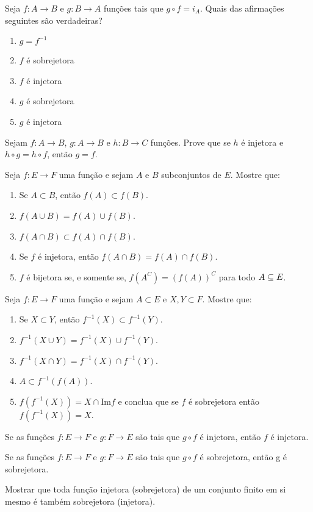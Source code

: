 \documentclass[12pt]{article}
\begin{document}
\vesp

\questao Seja $f : A \to B$ e $g : B \to A$ funções tais que $g \circ f = i_A$. Quais das afirmações seguintes são verdadeiras?
\begin{enumerate}
	\item $g = f^{-1}$
	\item $f$ é sobrejetora
	\item $f$ é injetora
	\item $g$ é sobrejetora
	\item $g$ é injetora
\end{enumerate}

\vesp

\questao Sejam $f : A \to B$, $g : A \to B$ e $h : B \to C$ funções. Prove que se $h$ é injetora e $h \circ g = h \circ f$, então $g = f$.

\vesp

\questao Seja $f:E\to F$ uma fun{\c c}{\~a}o e sejam $A$ e $B$ subconjuntos de $E$. Mostre que:
\begin{enumerate}[label={\alph*})]
\item Se $A\subset B$, ent{\~a}o $f(A)\subset f(B)$.
\item $f(A\cup B)=f(A)\cup f(B)$.
\item $f(A\cap B)\subset f(A)\cap f(B)$.
\item Se $f$ {\'e} injetora, ent{\~a}o $f(A\cap B) =  f(A)\cap f(B)$.
\item $f$ {\'e} bijetora se, e somente se, $f(A^C) = (f(A))^C$ para todo $A \subseteq E$.
\end{enumerate}

\vesp

\questao Seja $f:E\to F$ uma fun{\c c}{\~a}o e sejam $A\subset
E$ e $X, Y\subset F$. Mostre que:
\begin{enumerate}[label={\alph*})]
\item Se $X\subset Y$, ent{\~a}o $f^{-1}(X)\subset f^{-1}(Y)$.
\item $f^{-1}(X\cup Y)=f^{-1}(X)\cup f^{-1}(Y)$.
\item $f^{-1}(X\cap Y)= f^{-1}(X)\cap f^{-1}(Y)$.
\item $A\subset f^{-1}(f(A))$.
\item $f(f^{-1}(X))= X \cap \mbox{Im}f$ e conclua que se $f$ {\'e} sobrejetora ent{\~a}o
$f(f^{-1}(X))=X$.
\end{enumerate}

\vesp

\questao Se as fun{\c c}{\~o}es $f:E\to F$ e $g: F\to E$ s{\~a}o
tais que $g\circ f$ {\'e} injetora, ent{\~a}o $f$ {\'e} injetora.

\vesp

\questao Se as fun{\c c}{\~o}es $f:E\to F$ e $g: F\to E$ s{\~a}o
tais que $g\circ f$ {\'e} sobrejetora, ent{\~a}o g {\'e} sobrejetora.

\vesp

\questao Mostrar que toda fun{\c c}{\~a}o injetora (sobrejetora) de um conjunto finito em si mesmo {\'e} tamb{\'e}m sobrejetora (injetora).
\end{document}
